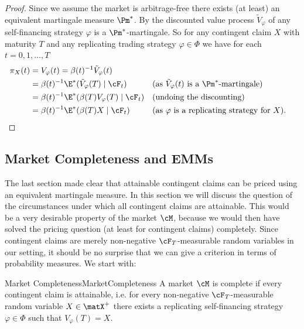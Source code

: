 \begin{proof}
	Since we assume the market is arbitrage-free there exists (at least) an equivalent martingale measure $\Pm^*$. By  the discounted value process $\tilde{V}_\varphi$ of any self-financing strategy $\varphi$ is a $\Pm^*$-martingale. So for any contingent claim $X$ with maturity $T$ and any replicating trading strategy $\varphi \in \Phi$ we have for each $t = 0, 1, \dots, T$
	\begin{equation}
		\begin{aligned}
			\pi_X(t) & = V_\varphi(t) = \beta(t)^{-1} \tilde{V}_\varphi(t)                                                                                 \\
			         & = \beta(t)^{-1} \E^*(\tilde{V}_\varphi(T) \mid \cF_t)  &  & (\text{as } \tilde{V}_\varphi(t) \text{ is a } \Pm^*\text{-martingale}) \\
			         & = \beta(t)^{-1} \E^*(\beta(T) V_\varphi(T) \mid \cF_t) &  & (\text{undoing the discounting})                                        \\
			         & = \beta(t)^{-1} \E^*(\beta(T)X \mid \cF_t)             &  & (\text{as } \varphi \text{ is a replicating strategy for } X).
		\end{aligned}
	\end{equation}
\end{proof}

\subsection{Market Completeness and EMMs}

The last section made clear that attainable contingent claims can be priced using an equivalent martingale measure. In this section we will discuss the question of the circumstances under which all contingent claims are attainable. This would be a very desirable property of the market $\cM$, because we would then have solved the pricing question (at least for contingent claims) completely. Since contingent claims are merely non-negative $\cF_T$-measurable random variables in our setting, it should be no surprise that we can give a criterion in terms of probability measures. We start with:

\begin{defn}{Market Completeness}{MarketCompleteness}
	A market $\cM$ is complete if every contingent claim is attainable, i.e. for every non-negative $\cF_T$-measurable random variable $X \in \matX^+$ there exists a replicating self-financing strategy $\varphi \in \Phi$ such that $V_\varphi(T) = X$.
\end{defn}

